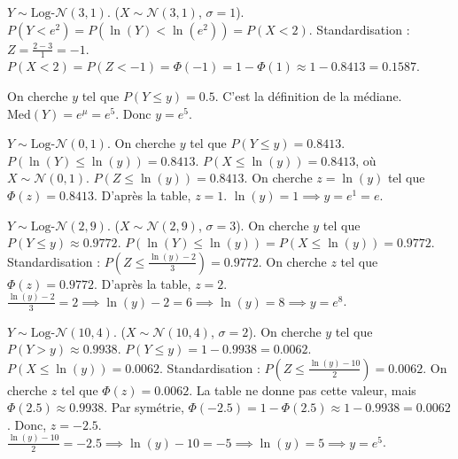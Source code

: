 \begin{correctionbox}
$Y \sim \text{Log-}\mathcal{N}(3, 1)$. ($X \sim \mathcal{N}(3, 1)$, $\sigma=1$).
$P(Y < e^2) = P(\ln(Y) < \ln(e^2)) = P(X < 2)$.
Standardisation : $Z = \frac{2 - 3}{1} = -1$.
$P(X < 2) = P(Z < -1) = \Phi(-1) = 1 - \Phi(1) \approx 1 - 0.8413 = 0.1587$.
\end{correctionbox}

\begin{correctionbox}
On cherche $y$ tel que $P(Y \le y) = 0.5$.
C'est la définition de la médiane. $\text{Med}(Y) = e^{\mu} = e^5$.
Donc $y = e^5$.
\end{correctionbox}

\begin{correctionbox}
$Y \sim \text{Log-}\mathcal{N}(0, 1)$. On cherche $y$ tel que $P(Y \le y) = 0.8413$.
$P(\ln(Y) \le \ln(y)) = 0.8413$.
$P(X \le \ln(y)) = 0.8413$, où $X \sim \mathcal{N}(0, 1)$.
$P(Z \le \ln(y)) = 0.8413$.
On cherche $z = \ln(y)$ tel que $\Phi(z) = 0.8413$. D'après la table, $z=1$.
$\ln(y) = 1 \implies y = e^1 = e$.
\end{correctionbox}

\begin{correctionbox}
$Y \sim \text{Log-}\mathcal{N}(2, 9)$. ($X \sim \mathcal{N}(2, 9)$, $\sigma=3$).
On cherche $y$ tel que $P(Y \le y) \approx 0.9772$.
$P(\ln(Y) \le \ln(y)) = P(X \le \ln(y)) = 0.9772$.
Standardisation : $P\left(Z \le \frac{\ln(y) - 2}{3}\right) = 0.9772$.
On cherche $z$ tel que $\Phi(z) = 0.9772$. D'après la table, $z=2$.
$\frac{\ln(y) - 2}{3} = 2 \implies \ln(y) - 2 = 6 \implies \ln(y) = 8 \implies y = e^8$.
\end{correctionbox}

\begin{correctionbox}
$Y \sim \text{Log-}\mathcal{N}(10, 4)$. ($X \sim \mathcal{N}(10, 4)$, $\sigma=2$).
On cherche $y$ tel que $P(Y > y) \approx 0.9938$.
$P(Y \le y) = 1 - 0.9938 = 0.0062$.
$P(X \le \ln(y)) = 0.0062$.
Standardisation : $P\left(Z \le \frac{\ln(y) - 10}{2}\right) = 0.0062$.
On cherche $z$ tel que $\Phi(z) = 0.0062$.
La table ne donne pas cette valeur, mais $\Phi(2.5) \approx 0.9938$.
Par symétrie, $\Phi(-2.5) = 1 - \Phi(2.5) \approx 1 - 0.9938 = 0.0062$.
Donc, $z = -2.5$.
$\frac{\ln(y) - 10}{2} = -2.5 \implies \ln(y) - 10 = -5 \implies \ln(y) = 5 \implies y = e^5$.
\end{correctionbox}

